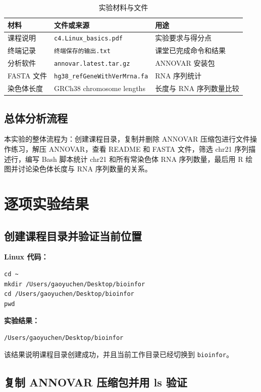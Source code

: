 \documentclass[12pt,a4paper,fontset=fandol]{ctexart}
\begin{document}
\begin{table}[H]
\centering
\caption{实验材料与文件}
\begin{tabular}{lll}
\toprule
材料 & 文件或来源 & 用途 \\
\midrule
课程说明 & \texttt{c4.Linux\_basics.pdf} & 实验要求与得分点 \\
终端记录 & \texttt{终端保存的输出.txt} & 课堂已完成命令和结果 \\
分析软件 & \texttt{annovar.latest.tar.gz} & ANNOVAR 安装包 \\
FASTA 文件 & \texttt{hg38\_refGeneWithVerMrna.fa} & RNA 序列统计 \\
染色体长度 & GRCh38 chromosome lengths & 长度与 RNA 序列数量比较 \\
\bottomrule
\end{tabular}
\end{table}

\subsection{总体分析流程}

本实验的整体流程为：创建课程目录，复制并删除 ANNOVAR 压缩包进行文件操作练习，解压 ANNOVAR，查看 README 和 FASTA 文件，筛选 chr21 序列描述行，编写 Bash 脚本统计 chr21 和所有常染色体 RNA 序列数量，最后用 R 绘图并讨论染色体长度与 RNA 序列数量的关系。

\section{逐项实验结果}

\subsection{创建课程目录并验证当前位置}

\noindent\textbf{Linux 代码：}
\begin{lstlisting}[style=linuxcode]
cd ~
mkdir /Users/gaoyuchen/Desktop/bioinfor
cd /Users/gaoyuchen/Desktop/bioinfor
pwd
\end{lstlisting}

\noindent\textbf{实验结果：}
\begin{lstlisting}[style=resultcode]
/Users/gaoyuchen/Desktop/bioinfor
\end{lstlisting}

该结果说明课程目录创建成功，并且当前工作目录已经切换到 \texttt{bioinfor}。

\subsection{复制 ANNOVAR 压缩包并用 ls 验证}
\end{document}
